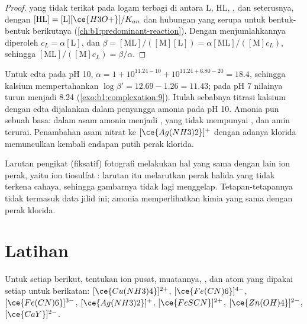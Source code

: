 \begin{proof}
 yang tidak terikat pada logam terbagi di antara L, HL, , dan
seterusnya, dengan $[\mathrm{HL}] = [\mathrm{L}][\ce{H3O+}]/K_{an}$ dan
hubungan yang serupa untuk bentuk-bentuk berikutnya
(\cref{ch:b1:predominant-reaction}). Dengan menjumlahkannya diperoleh
$c_L = \alpha[\mathrm{L}]$,
dan $\beta = [\mathrm{ML}]/([\mathrm{M}][\mathrm{L}]) =
\alpha[\mathrm{ML}]/([\mathrm{M}]c_L)$, sehingga $[\mathrm{ML}]/([\mathrm{M}]c_L)
= \beta/\alpha$.
\end{proof}

Untuk edta pada pH 10, $\alpha = 1 + 10^{11.24 - 10} + 10^{11.24 + 6.80 - 20}
= 18.4$, sehingga  kalsium mempertahankan
$\log\beta' = 12.69 - 1.26 = 11.43$; pada pH 7 nilainya turun menjadi
8.24 (\cref{exo:b1:complexation:9}). Itulah sebabnya titrasi kalsium
dengan edta dijalankan dalam penyangga amonia pada pH 10. Amonia pun
sebuah basa: dalam asam amonia menjadi , yang tidak mempunyai
, dan  amin terurai. Penambahan
asam nitrat ke $[\ce{Ag(NH3)2}]^{+}$ dengan adanya klorida memunculkan
kembali endapan putih perak klorida.

Larutan pengikat (fiksatif) fotografi melakukan hal yang sama dengan
 lain ion perak, yaitu ion tiosulfat : larutan itu
melarutkan perak halida yang tidak terkena cahaya, sehingga gambarnya
tidak lagi menggelap. Tetapan-tetapannya tidak termasuk data jilid ini;
amonia memperlihatkan kimia yang sama dengan perak klorida.

\section{Latihan}

\begin{exercise}[$\star$]\label{exo:b1:complexation:1}
Untuk setiap  berikut, tentukan ion pusat, muatannya, ,
dan atom yang dipakai setiap  untuk berikatan:
$[\ce{Cu(NH3)4}]^{2+}$,
$[\ce{Fe(CN)6}]^{4-}$, $[\ce{Fe(CN)6}]^{3-}$, $[\ce{Ag(NH3)2}]^{+}$,
$[\ce{FeSCN}]^{2+}$, $[\ce{Zn(OH)4}]^{2-}$, $[\ce{CaY}]^{2-}$.
\end{exercise}

